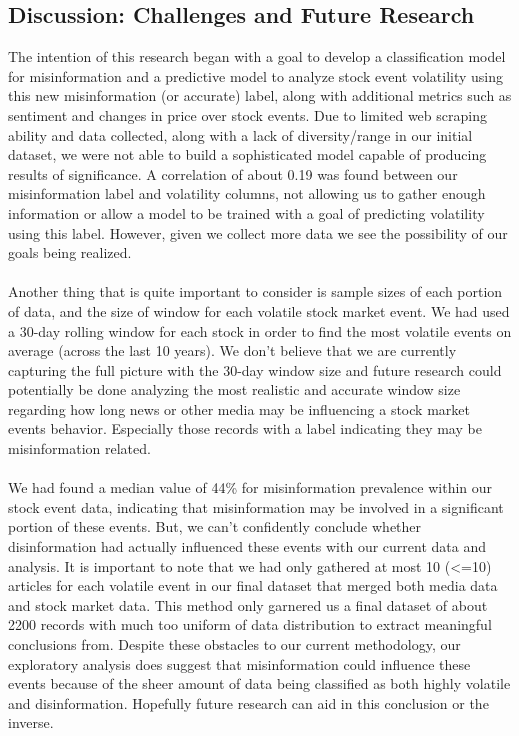 \documentclass{article}
\begin{document}
\subsection{Discussion: Challenges and Future Research}
The intention of this research began with a goal to develop a classification model for misinformation and a predictive model to analyze stock event volatility using this new misinformation (or accurate) label, along with additional metrics such as sentiment and changes in price over stock events. Due to limited web scraping ability and data collected, along with a lack of diversity/range in our initial dataset, we were not able to build a sophisticated model capable of producing results of significance. A correlation of about 0.19 was found between our misinformation label and volatility columns, not allowing us to gather enough information or allow a model to be trained with a goal of predicting volatility using this label. However, given we collect more data we see the possibility of our goals being realized. 
\\\\
Another thing that is quite important to consider is sample sizes of each portion of data, and the size of window for each volatile stock market event. We had used a 30-day rolling window for each stock in order to find the most volatile events on average (across the last 10 years). We don't believe that we are currently capturing the full picture with the 30-day window size and future research could potentially be done analyzing the most realistic and accurate window size regarding how long news or other media may be influencing a stock market events behavior. Especially those records with a label indicating they may be misinformation related.
\\\\
We had found a median value of 44\% for misinformation prevalence within our stock event data, indicating that misinformation may be involved in a significant portion of these events. But, we can't confidently conclude whether disinformation had actually influenced these events with our current data and analysis. It is important to note that we had only gathered at most 10 (<=10) articles for each volatile event in our final dataset that merged both media data and stock market data. This method only garnered us a final dataset of about 2200 records with much too uniform of data distribution to extract meaningful conclusions from. Despite these obstacles to our current methodology, our exploratory analysis does suggest that misinformation could influence these events because of the sheer amount of data being classified as both highly volatile and disinformation. Hopefully future research can aid in this conclusion or the inverse. 
\end{document}
